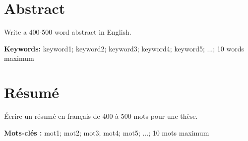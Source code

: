 \chapter*{Abstract}
Write a 400-500 word abstract in English.

\noindent\textbf{Keywords:} keyword1; keyword2; keyword3; keyword4; keyword5; ...; 10 words maximum
\newpage

\newpage
{}
\chapter*{Résumé}
Écrire un résumé en français de 400 à 500 mots pour une thèse.

\noindent\textbf{Mots-clés :} mot1; mot2; mot3; mot4; mot5; ...; 10 mots maximum
\newpage
